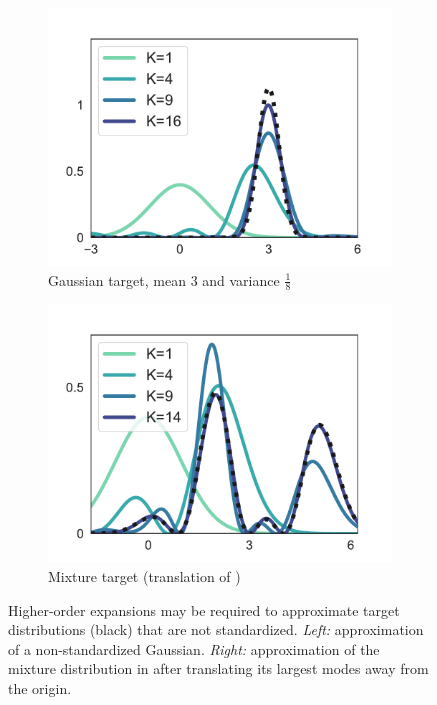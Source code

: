 \begin{figure}
\centering
\begin{subfigure}[b]{0.40\linewidth}
    \centering
    \includegraphics[scale=0.31]{figs/1d_precond_gauss2.pdf}
    \caption{Gaussian target, mean $3$ and variance $\frac{1}{8}$}
\end{subfigure}
\begin{subfigure}[b]{0.40\linewidth}
    \centering
    \includegraphics[scale=0.31]{figs/1d_precond_mixture2.pdf}
\caption{Mixture target (translation of )}
\end{subfigure}
    \caption{Higher-order expansions may be required to approximate target distributions
(black)
    that are not standardized. \textit{Left:} approximation of a non-standardized Gaussian.
    \textit{Right:} approximation of the mixture distribution
    in  after translating its largest modes away from the origin.
}
\label{fig:standardize}
\vspace{-13pt}
\end{figure}

